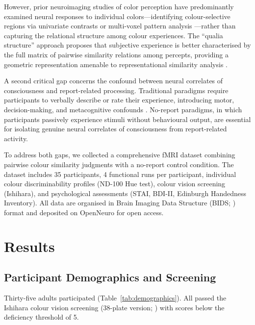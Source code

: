 \documentclass[11pt]{article}
\begin{document}
However, prior neuroimaging studies of color perception have predominantly examined neural responses to individual colors---identifying colour-selective regions via univariate contrasts or multi-voxel pattern analysis \citep{brouwer2009decoding, lafer2016decoding, haxby2001distributed}---rather than capturing the relational structure among colour experiences. The ``qualia structure'' approach \citep{harada2020color} proposes that subjective experience is better characterised by the full matrix of pairwise similarity relations among percepts, providing a geometric representation amenable to representational similarity analysis \citep{kriegeskorte2008rsa, kragel2019representation}.

A second critical gap concerns the confound between neural correlates of consciousness and report-related processing. Traditional paradigms require participants to verbally describe or rate their experience, introducing motor, decision-making, and metacognitive confounds \citep{tsuchiya2015no}. No-report paradigms, in which participants passively experience stimuli without behavioural output, are essential for isolating genuine neural correlates of consciousness from report-related activity.

To address both gaps, we collected a comprehensive fMRI dataset combining pairwise colour similarity judgments with a no-report control condition. The dataset includes 35 participants, 4 functional runs per participant, individual colour discriminability profiles (ND-100 Hue test), colour vision screening (Ishihara), and psychological assessments (STAI, BDI-II, Edinburgh Handedness Inventory). All data are organised in Brain Imaging Data Structure (BIDS; \citealt{gorgolewski2016brain}) format and deposited on OpenNeuro for open access.

\section{Results}

\subsection{Participant Demographics and Screening}

Thirty-five adults participated (Table~\ref{tab:demographics}). All passed the Ishihara colour vision screening (38-plate version; \citealt{ishihara1972tests}) with scores below the deficiency threshold of 5.
\end{document}
